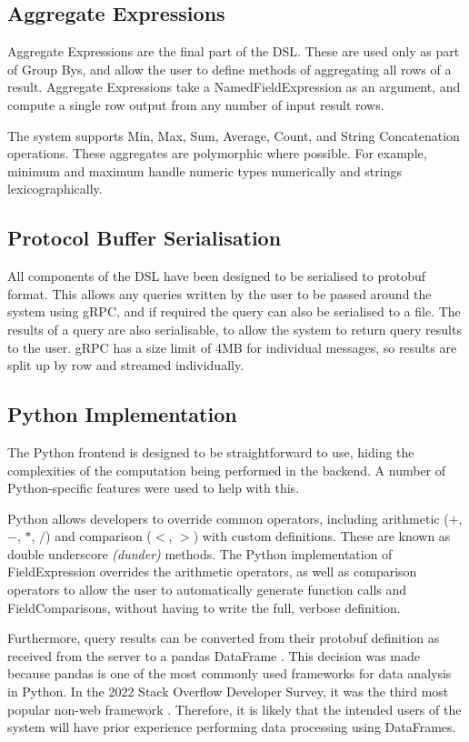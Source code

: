 \subsection{Aggregate Expressions}
Aggregate Expressions are the final part of the DSL. These are used only as part of Group Bys, and allow the user to define methods of aggregating all rows of a result. Aggregate Expressions take a NamedFieldExpression as an argument, and compute a single row output from any number of input result rows.

The system supports Min, Max, Sum, Average, Count, and String Concatenation operations. These aggregates are polymorphic where possible. For example, minimum and maximum handle numeric types numerically and strings lexicographically.


\subsection{Protocol Buffer Serialisation}
All components of the DSL have been designed to be serialised to protobuf format. This allows any queries written by the user to be passed around the system using gRPC, and if required the query can also be serialised to a file. The results of a query are also serialisable, to allow the system to return query results to the user. gRPC has a size limit of 4MB for individual messages, so results are split up by row and streamed individually.

\subsection{Python Implementation}
The Python frontend is designed to be straightforward to use, hiding the complexities of the computation being performed in the backend. A number of Python-specific features were used to help with this.

Python allows developers to override common operators, including arithmetic ($+$, $-$, $*$, $/$) and comparison ($<$, $>$) with custom definitions. These are known as double underscore \textit{(dunder)} methods. The Python implementation of FieldExpression overrides the arithmetic operators, as well as comparison operators to allow the user to automatically generate function calls and FieldComparisons, without having to write the full, verbose definition.

Furthermore, query results can be converted from their protobuf definition as received from the server to a pandas DataFrame \cite{reback2020pandas}. This decision was made because pandas is one of the most commonly used frameworks for data analysis in Python. In the 2022 Stack Overflow Developer Survey, it was the third most popular non-web framework \cite{stackoverflowsurvey2022}. Therefore, it is likely that the intended users of the system will have prior experience performing data processing using DataFrames.


